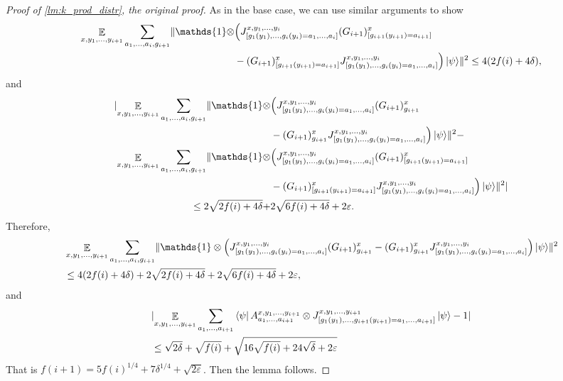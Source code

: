\documentclass[11pt]{article}
\theoremstyle{plain}
\theoremstyle{definition}
\DeclarePairedDelimiter{\norm}{\lVert}{\rVert}
\DeclarePairedDelimiter{\abs}{\lvert}{\rvert}
\newcommand {\bra} [1] {\ensuremath{ \left\langle #1 \right| }}
\newcommand {\ket} [1] {\ensuremath{ \left| #1 \right\rangle }}
\DeclareMathOperator*{\bigE}{\mathbb{E}}
\newcommand {\id} {\ensuremath{\mathds{1}}}
\newcommand{\ep} {\ensuremath{\varepsilon}}
\newcommand{\x}{\otimes}
\newcommand{\1}{\mathbb{1}} %
\begin{document}
\begin{proof}[Proof of \cref{lm:k_prod_distr}, the original proof]
	As in the base case, we can use similar arguments to show
	\begin{align*}
		\bigE_{x,y_1,\ldots,y_{i+1}} \sum_{a_1,\ldots,a_i, g_{i+1}} \norm{ \id \x &\Big( J_{[g_1(y_1),\ldots,g_{i}(y_{i}) = a_1, \ldots,a_{i}]}^{x,y_1,\ldots,y_i}(G_{i+1})^x_{[g_{i+1}(y_{i+1}) = a_{i+1}]} \\
		&- (G_{i+1})^x_{[g_{i+1}(y_{i+1})=a_{i+1}]}   J_{[g_1(y_1),\ldots,g_{i}(y_{i}) = a_1, \ldots,a_{i}]}^{x,y_1,\ldots,y_i} \Big) \ket{\psi}}^2
		\leq 4(2f(i) + 4 \delta),
	\end{align*}
	and 
	\begin{align*}
		\abs{ \bigE_{x,y_1,\ldots,y_{i+1}} \sum_{a_1,\ldots,a_i, g_{i+1}} \norm{ \id \x &\Big( J_{[g_1(y_1),\ldots,g_{i}(y_{i}) = a_1, \ldots,a_{i}]}^{x,y_1,\ldots,y_i}(G_{i+1})^x_{g_{i+1}} \\
		 &- (G_{i+1})^x_{g_{i+1}} J_{[g_1(y_1),\ldots,g_{i}(y_{i}) = a_1, \ldots,a_{i}]}^{x,y_1,\ldots,y_i} \Big) \ket{\psi}}^2
		-  \\
		\bigE_{x,y_1,\ldots,y_{i+1}} \sum_{a_1,\ldots,a_i, g_{i+1}} \norm{ \id \x &\Big( J_{[g_1(y_1),\ldots,g_{i}(y_{i}) = a_1, \ldots,a_{i}]}^{x,y_1,\ldots,y_i}(G_{i+1})^x_{[g_{i+1}(y_{i+1}) = a_{i+1}]} \\
		&- (G_{i+1})^x_{[g_{i+1}(y_{i+1})=a_{i+1}]}   J_{[g_1(y_1),\ldots,g_{i}(y_{i}) = a_1, \ldots,a_{i}]}^{x,y_1,\ldots,y_i} \Big) \ket{\psi}}^2} \\
		\leq 2 \sqrt{2f(i) + 4 \delta} + &2 \sqrt{6f(i) + 4\delta} + 2\ep.
	\end{align*}
	Therefore,
	\begin{align*}
		&\bigE_{x,y_1,\ldots,y_{i+1}} \sum_{a_1,\ldots,a_i, g_{i+1}} \norm{ \id \x \Big( J_{[g_1(y_1),\ldots,g_{i}(y_{i}) = a_1, \ldots,a_{i}]}^{x,y_1,\ldots,y_i}(G_{i+1})^x_{g_{i+1}} - (G_{i+1})^x_{g_{i+1}} J_{[g_1(y_1),\ldots,g_{i}(y_{i}) = a_1, \ldots,a_{i}]}^{x,y_1,\ldots,y_i} \Big) \ket{\psi}}^2 \\
		&\leq 4(2f(i) + 4 \delta) + 2 \sqrt{2f(i) + 4 \delta} + 2 \sqrt{6f(i) + 4\delta} + 2\ep,
	\end{align*}
	and
	\begin{align*}
		&\abs{ \bigE_{x,y_1,\ldots,y_{i+1}} \sum_{a_1,\ldots, a_{i+1}} \bra{\psi} A^{x,y_1,\ldots,y_{i+1}}_{a_1,\ldots,a_{i+1}} \x J^{x,y_1,\ldots,y_{i+1}}_{[g_1(y_1),\ldots,g_{i+1}(y_{i+1}) = a_1, \ldots,a_{i+1}]} \ket{\psi} -1} \\
		&\leq \sqrt{2\delta} + \sqrt{f(i)} + \sqrt{16\sqrt{f(i)} + 24 \sqrt{\delta} + 2\ep }
	\end{align*}
	That is $f(i+1) = 5f(i)^{1/4}  + 7 \delta^{1/4} + \sqrt{2\ep}$. Then the lemma follows.
\end{proof}
%
\end{document}
